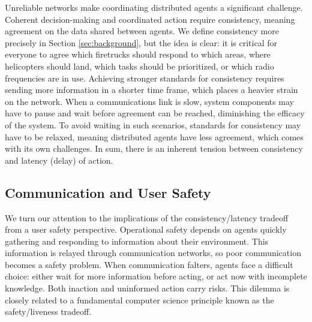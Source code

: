 \documentclass[]             %
{NASA}                       %
\theoremstyle{definition}
\begin{document}
Unreliable networks make coordinating distributed agents a significant
challenge. Coherent decision-making and coordinated action require
consistency, meaning agreement on the data shared between agents. We
define consistency more precisely in Section \ref{sec:background}, but
the idea is clear: it is critical for everyone to agree which
firetrucks should respond to which areas, where helicopters should
land, which tasks should be prioritized, or which radio frequencies
are in use. Achieving stronger standards for consistency requires
sending more information in a shorter time frame, which places a
heavier strain on the network. When a communications link is slow,
system components may have to pause and wait before agreement can be
reached, diminishing the efficacy of the system. To avoid waiting in
such scenarios, standards for consistency may have to be relaxed,
meaning distributed agents have less agreement, which comes with its
own challenges. In sum, there is an inherent tension between
consistency and latency (delay) of action.

\subsection{Communication and User Safety}
\label{ssec:communication-and-safety}
We turn our attention to the implications of the consistency/latency
tradeoff from a user safety perspective. Operational safety depends on
agents quickly gathering and responding to information about their
environment. This information is relayed through communication
networks, so poor communication becomes a safety problem. When
communication falters, agents face a difficult choice: either wait for
more information before acting, or act now with incomplete
knowledge. Both inaction and uninformed action carry risks. This
dilemma is closely related to a fundamental computer science principle
known as the safety/liveness tradeoff.
\end{document}
